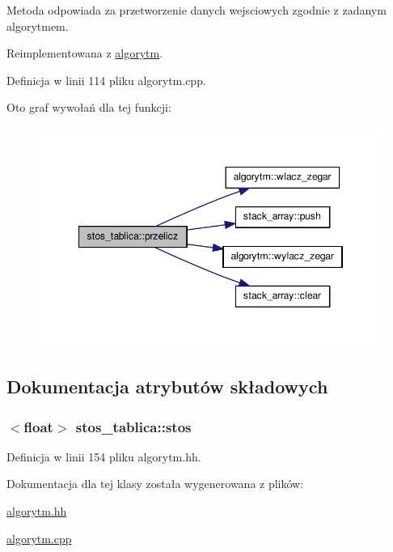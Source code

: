 \-Metoda odpowiada za przetworzenie danych wejsciowych zgodnie z zadanym algorytmem. 



\-Reimplementowana z \hyperlink{classalgorytm_af3f92bf537b1f2e1f93173983e838449}{algorytm}.



\-Definicja w linii 114 pliku algorytm.\-cpp.



\-Oto graf wywołań dla tej funkcji\-:\nopagebreak
\begin{figure}[H]
\begin{center}
\leavevmode
\includegraphics[width=346pt]{classstos__tablica_a44ec89c9723d4034e46ae3b51b01faea_cgraph}
\end{center}
\end{figure}




\subsection{\-Dokumentacja atrybutów składowych}
\hypertarget{classstos__tablica_a8aa72aa52bd2436cb12d9e1c8e077389}{
\subsubsection[{stos}]{$<$float$>$ {\bf stos\-\_\-tablica\-::stos}}}\label{classstos__tablica_a8aa72aa52bd2436cb12d9e1c8e077389}


\-Definicja w linii 154 pliku algorytm.\-hh.



\-Dokumentacja dla tej klasy została wygenerowana z plików\-:\begin{DoxyCompactItemize}
\item 
\hyperlink{algorytm_8hh}{algorytm.\-hh}\item 
\hyperlink{algorytm_8cpp}{algorytm.\-cpp}\end{DoxyCompactItemize}
